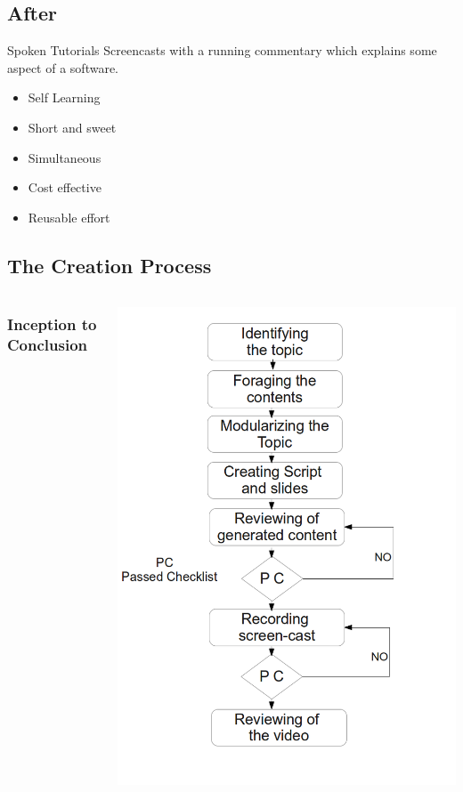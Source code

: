 \documentclass[compress,red]{beamer} %
\begin{document}
\subsection{After}
\begin{frame}
\begin{block}{Spoken Tutorials}
Screencasts with a running commentary which explains some aspect of a software.
\end{block}
\begin{exampleblock}{}
\begin{itemize}
\item Self Learning
\item Short and sweet
\item Simultaneous
\item Cost effective
\item Reusable effort
\end{itemize}
\end{exampleblock}
\end{frame}

\subsection{The Creation Process}
\begin{frame}
\begin{columns}
\frametitle{Inception to Conclusion}
\includegraphics[scale=0.25]{st-fc.png}
\end{columns}
\end{frame}
\end{document}
